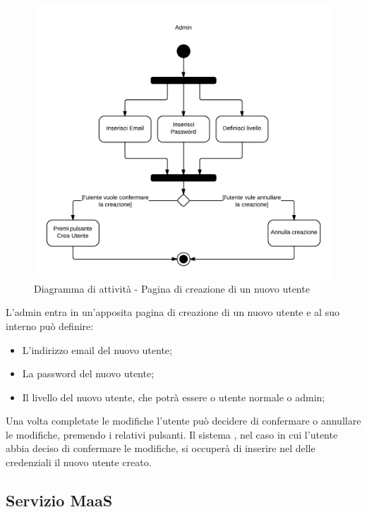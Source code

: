 \begin{figure}[H]
\centering
\includegraphics[scale=0.2]{uml/MaaP - Crea nuovo utente.png}
\caption{Diagramma di attività - Pagina di creazione di un nuovo utente}
\end{figure}

L'admin entra in un'apposita pagina di creazione di un nuovo utente e al suo interno può definire:

\begin{itemize}

	\item L'indirizzo email del nuovo utente;
	\item La password del nuovo utente;
	\item Il livello del nuovo utente, che potrà essere o utente normale o admin;

\end{itemize}

Una volta completate le modifiche l'utente può decidere di confermare o annullare le modifiche, premendo i relativi pulsanti. Il sistema , nel caso in cui l'utente abbia deciso di confermare le modifiche, si occuperà di inserire nel  delle credenziali il nuovo utente creato.

\subsection{Servizio MaaS}

